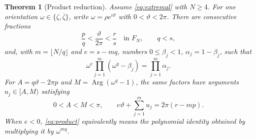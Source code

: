 \documentclass[11pt,a4paper]{article}
\DeclareMathOperator{\Arg}{Arg}
\newtheorem{theorem}{Theorem}[section]
\theoremstyle{definition}
\theoremstyle{remark}
\numberwithin{equation}{section}
\begin{document}
\begin{theorem}[Product reduction]\label{thm:product}
Assume \eqref{eq:extremal} with $N\ge4$. For one orientation $\omega\in\{\zeta,\overline\zeta\}$, write $\omega=\rho e^{i\vartheta}$ with $0<\vartheta<2\pi$. There are consecutive fractions
\[
 \frac pq<\frac{\vartheta}{2\pi}<\frac rs\quad\text{in }F_N,
 \qquad q<s,
\]
and, with $m=\lfloor N/q\rfloor$ and $e=s-mq$, numbers $0\le\beta_j<1$, $\alpha_j=1-\beta_j$, such that
\begin{equation}\label{eq:product}
 \omega^e\prod_{j=1}^m(\omega^q-\beta_j)=\prod_{j=1}^m\alpha_j.
\end{equation}
For $A=q\vartheta-2\pi p$ and $M=\Arg(\omega^q-1)$, the same factors have arguments $u_j\in[A,M)$ satisfying
\begin{equation}\label{eq:product-phase}
 0<A<M<\pi,\qquad
 e\vartheta+\sum_{j=1}^m u_j=2\pi(r-mp).
\end{equation}
When $e<0$, \eqref{eq:product} equivalently means the polynomial identity obtained by multiplying it by $\omega^{mq}$.
\end{theorem}
\end{document}
